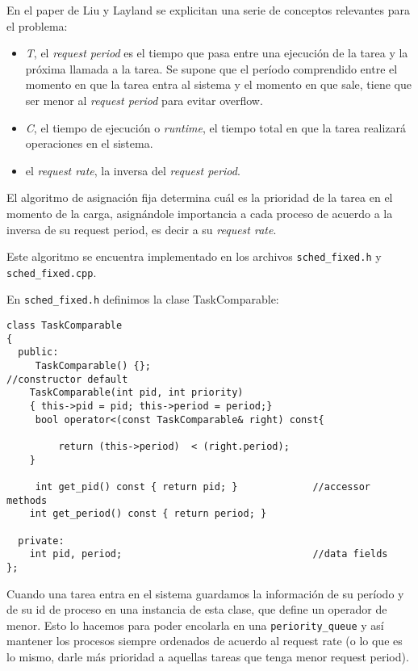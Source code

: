 En el paper de Liu y Layland se explicitan una serie de conceptos relevantes para el problema:

\begin{itemize}
	\item \textit{T}, el \textit{request period} es el tiempo que pasa entre una ejecuci\'on de la tarea y la pr\'oxima llamada a la tarea. Se supone que el per\'iodo comprendido entre el momento en que la tarea entra al sistema y el momento en que sale, tiene que ser menor al \textit{request period} para evitar overflow.
    
    \item \textit{C}, el tiempo de ejecuci\'on o \textit{runtime}, el tiempo total en que la tarea realizar\'a operaciones en el sistema.
    
    \item el \textit{request rate}, la inversa del \textit{request period}.
\end{itemize}

El algoritmo de asignaci\'on fija  determina cu\'al es la prioridad de la tarea en el momento de la carga, asign\'andole importancia a cada proceso de acuerdo a la inversa de su request period, es decir a su \textit{request rate}.

Este algoritmo se encuentra implementado en los archivos \verb+sched_fixed.h+ y \verb+sched_fixed.cpp+.

En \verb+sched_fixed.h+ definimos la clase  TaskComparable:

\begin{verbatim}
class TaskComparable
{
  public:
     TaskComparable() {};                                      //constructor default
    TaskComparable(int pid, int priority)
    { this->pid = pid; this->period = period;}    
     bool operator<(const TaskComparable& right) const{
   
         return (this->period)  < (right.period);
    }

     int get_pid() const { return pid; }             //accessor methods
    int get_period() const { return period; }

  private:
    int pid, period;                                 //data fields
};
\end{verbatim}

Cuando una tarea entra en el sistema guardamos la informaci\'on de su per\'iodo y de su id de proceso en una instancia de esta clase, que define un operador de menor. Esto lo hacemos para poder encolarla en una \verb+periority_queue+ y as\'i mantener los procesos siempre ordenados de acuerdo al request rate (o lo que es lo mismo, darle m\'as prioridad a aquellas tareas que tenga menor request period).

